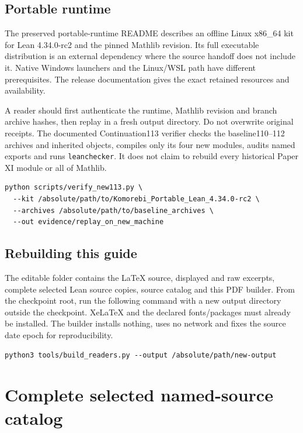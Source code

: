 \documentclass[10pt,oneside]{book}
\begin{document}
\section{Portable runtime}
The preserved portable-runtime README describes an offline Linux x86\_64 kit for Lean 4.34.0-rc2 and the pinned Mathlib revision. Its full executable distribution is an external dependency where the source handoff does not include it. Native Windows launchers and the Linux/WSL path have different prerequisites. The release documentation gives the exact retained resources and availability.

A reader should first authenticate the runtime, Mathlib revision and branch archive hashes, then replay in a fresh output directory. Do not overwrite original receipts. The documented Continuation113 verifier checks the baseline110--112 archives and inherited objects, compiles only its four new modules, audits named exports and runs \texttt{leanchecker}. It does not claim to rebuild every historical Paper XI module or all of Mathlib.

\begin{Verbatim}[fontsize=\small,breaklines=true,breakanywhere=true]
python scripts/verify_new113.py \
  --kit /absolute/path/to/Komorebi_Portable_Lean_4.34.0-rc2 \
  --archives /absolute/path/to/baseline_archives \
  --out evidence/replay_on_new_machine
\end{Verbatim}

\section{Rebuilding this guide}
The editable folder contains the LaTeX source, displayed and raw excerpts, complete selected Lean source copies, source catalog and this PDF builder. From the checkpoint root, run the following command with a new output directory outside the checkpoint. XeLaTeX and the declared fonts/packages must already be installed. The builder installs nothing, uses no network and fixes the source date epoch for reproducibility.

\begin{Verbatim}[fontsize=\small,breaklines=true]
python3 tools/build_readers.py --output /absolute/path/new-output
\end{Verbatim}

\appendix\chapter{Complete selected named-source catalog}\label{guide:catalog}
\end{document}
